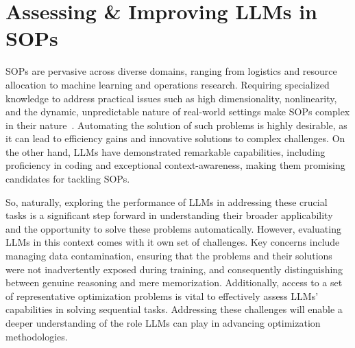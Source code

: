 \section{Assessing \& Improving LLMs in SOPs}
\label{sec:part1_evaluatingLLMs}
SOPs are pervasive across diverse domains, ranging from logistics and resource allocation to machine learning and operations research. Requiring specialized knowledge to address practical issues such as high dimensionality, nonlinearity, and the dynamic, unpredictable nature of real-world settings make SOPs complex in their nature~\cite{opt_complex}. Automating the solution of such problems is highly desirable, as it can lead to efficiency gains and innovative solutions to complex challenges. On the other hand, LLMs have demonstrated remarkable capabilities, including proficiency in coding and exceptional context-awareness, making them promising candidates for tackling SOPs. 

So, naturally, exploring the performance of LLMs in addressing these crucial tasks is a significant step forward in understanding their broader applicability and the opportunity to solve these problems automatically. However, evaluating LLMs in this context comes with it own set of challenges. Key concerns include managing data contamination, ensuring that the problems and their solutions were not inadvertently exposed during training, and consequently distinguishing between genuine reasoning and mere memorization. Additionally, access to a set of representative optimization problems is vital to effectively assess LLMs' capabilities in solving sequential tasks. Addressing these challenges will enable a deeper understanding of the role LLMs can play in advancing optimization methodologies.


    

